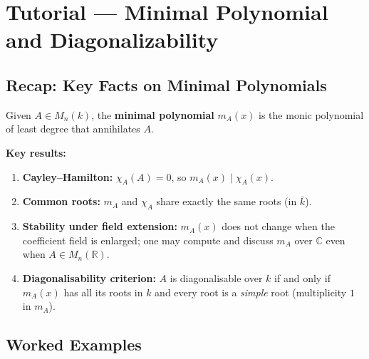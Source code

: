 \section{Tutorial — Minimal Polynomial and Diagonalizability}

\subsection{Recap: Key Facts on Minimal Polynomials}

\begin{tipbox}
Given $A \in M_{n}(k)$, the \textbf{minimal polynomial} $m_A(x)$ is the monic
polynomial of least degree that annihilates $A$.

\medskip
\textbf{Key results:}
\begin{enumerate}[leftmargin=1.5em,itemsep=3pt]
  \item \textbf{Cayley--Hamilton:} $\chi_A(A)=0$, so $m_A(x)\mid\chi_A(x)$.
  \item \textbf{Common roots:} $m_A$ and $\chi_A$ share exactly the same
        roots (in $\bar{k}$).
  \item \textbf{Stability under field extension:} $m_A(x)$ does not change
        when the coefficient field is enlarged; one may compute and discuss
        $m_A$ over $\mathbb{C}$ even when $A\in M_n(\mathbb{R})$.
  \item \textbf{Diagonalisability criterion:} $A$ is diagonalisable over
        $k$ if and only if $m_A(x)$ has all its roots in $k$ and
        every root is a \emph{simple} root (multiplicity $1$ in $m_A$).
\end{enumerate}
\end{tipbox}

\subsection{Worked Examples}

